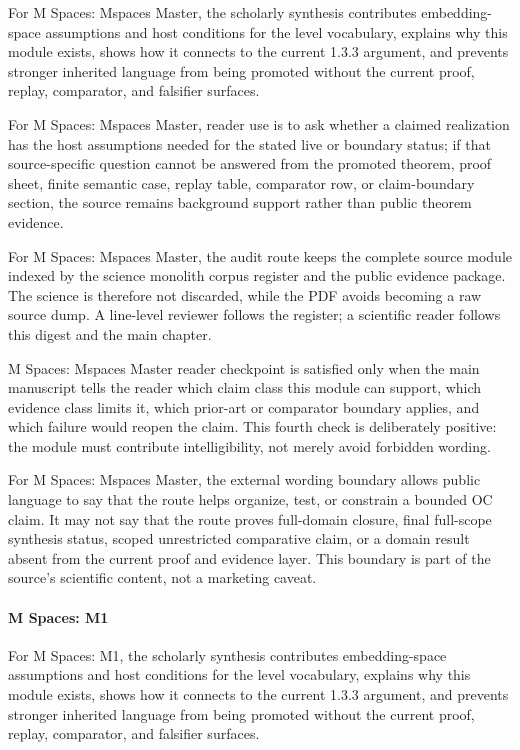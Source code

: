 For M Spaces: Mspaces Master, the scholarly synthesis contributes embedding-space assumptions and host conditions for the level vocabulary, explains why this module exists, shows how it connects to the current 1.3.3 argument, and prevents stronger inherited language from being promoted without the current proof, replay, comparator, and falsifier surfaces.


For M Spaces: Mspaces Master, reader use is to ask whether a claimed realization has the host assumptions needed for the stated live or boundary status; if that source-specific question cannot be answered from the promoted theorem, proof sheet, finite semantic case, replay table, comparator row, or claim-boundary section, the source remains background support rather than public theorem evidence.


For M Spaces: Mspaces Master, the audit route keeps the complete source module indexed by the science monolith corpus register and the public evidence package. The science is therefore not discarded, while the PDF avoids becoming a raw source dump. A line-level reviewer follows the register; a scientific reader follows this digest and the main chapter.


M Spaces: Mspaces Master reader checkpoint is satisfied only when the main manuscript tells the reader which claim class this module can support, which evidence class limits it, which prior-art or comparator boundary applies, and which failure would reopen the claim. This fourth check is deliberately positive: the module must contribute intelligibility, not merely avoid forbidden wording.


For M Spaces: Mspaces Master, the external wording boundary allows public language to say that the route helps organize, test, or constrain a bounded OC claim. It may not say that the route proves full-domain closure, final full-scope synthesis status, scoped unrestricted comparative claim, or a domain result absent from the current proof and evidence layer. This boundary is part of the source's scientific content, not a marketing caveat.


\paragraph{M Spaces: M1}

For M Spaces: M1, the scholarly synthesis contributes embedding-space assumptions and host conditions for the level vocabulary, explains why this module exists, shows how it connects to the current 1.3.3 argument, and prevents stronger inherited language from being promoted without the current proof, replay, comparator, and falsifier surfaces.


